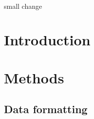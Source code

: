 \documentclass{article}
\begin{document}
small change

\section{Introduction}
\section{Methods}
\subsection{Data formatting}
\end{document}
